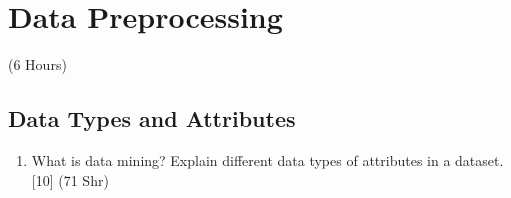 \documentclass[12pt]{article}
\begin{document}
\pagebreak
\section{Data Preprocessing}
\begin{center}(6 Hours)\end{center}

  \subsection{Data Types and Attributes}
    \begin{enumerate}[topsep=0pt, noitemsep]
      \item What is data mining? Explain different data types of attributes in a dataset. \hfill [10] (71 Shr)
    \end{enumerate}
\end{document}
